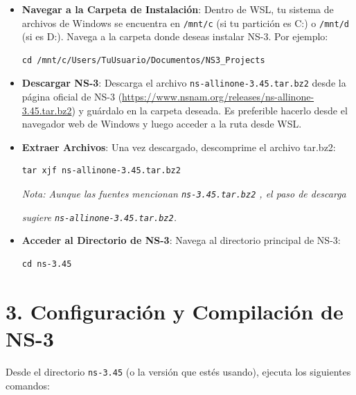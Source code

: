 \documentclass{article}
\begin{document}
\begin{itemize}
    \item \textbf{Navegar a la Carpeta de Instalación}: Dentro de WSL, tu sistema de archivos de Windows se encuentra en \texttt{/mnt/c} (si tu partición es C:) o \texttt{/mnt/d} (si es D:). Navega a la carpeta donde deseas instalar NS-3. Por ejemplo:
    \begin{lstlisting}
cd /mnt/c/Users/TuUsuario/Documentos/NS3_Projects 
    \end{lstlisting}
    \item \textbf{Descargar NS-3}: Descarga el archivo \texttt{ns-allinone-3.45.tar.bz2} desde la página oficial de NS-3 (\url{https://www.nsnam.org/releases/ns-allinone-3.45.tar.bz2}) y guárdalo en la carpeta deseada. Es preferible hacerlo desde el navegador web de Windows y luego acceder a la ruta desde WSL.
    \item \textbf{Extraer Archivos}: Una vez descargado, descomprime el archivo tar.bz2:
    \begin{lstlisting}
tar xjf ns-allinone-3.45.tar.bz2
    \end{lstlisting}
    \textit{Nota: Aunque las fuentes mencionan \texttt{ns-3.45.tar.bz2} , el paso de descarga}

        \textit{sugiere \texttt{ns-allinone-3.45.tar.bz2}.}
    \item \textbf{Acceder al Directorio de NS-3}: Navega al directorio principal de NS-3:
    \begin{lstlisting}
cd ns-3.45  
    \end{lstlisting}
\end{itemize}

\section*{\textbf{3. Configuración y Compilación de NS-3}}

Desde el directorio \texttt{ns-3.45} (o la versión que estés usando), ejecuta los siguientes comandos:
\end{document}
